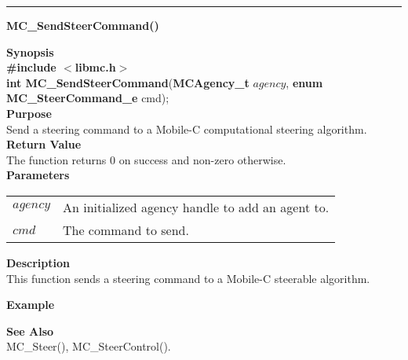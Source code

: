 \noindent
\vspace{5pt}
\rule{6.5in}{0.015in}
\noindent
{}
{\LARGE \bf MC\_SendSteerCommand()}\\
\label{api:MC_SendSteerCommand()}

\noindent
{\bf Synopsis}\\
{\bf \#include $<$libmc.h$>$}\\
{\bf int MC\_SendSteerCommand}({\bf MCAgency\_t} $agency$, {\bf enum MC\_SteerCommand\_e} cmd);\\

\noindent
{\bf Purpose}\\
Send a steering command to a Mobile-C computational steering algorithm.\\

\noindent
{\bf Return Value}\\
The function returns 0 on success and non-zero otherwise.\\

\noindent
{\bf Parameters}
\vspace{-0.1in}
\begin{description}
\item
\begin{tabular}{p{10 mm}p{145 mm}} 
$agency$ & An initialized agency handle to add an agent to.\\
$cmd$ & The command to send.
\end{tabular}
\end{description}

\noindent
{\bf Description}\\
This function sends a steering command to a Mobile-C steerable algorithm.

\noindent
{\bf Example}\\
\noindent
{\footnotesize}

\noindent
{\bf See Also}\\
MC\_Steer(), MC\_SteerControl().

